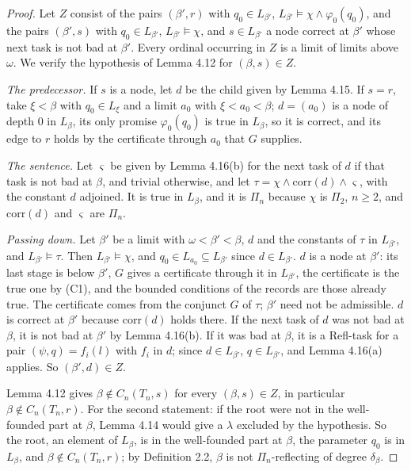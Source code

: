 \documentclass[11pt]{article}
\begin{document}
\begin{proof}
Let $Z$ consist of the pairs $(\beta', r)$ with $q_0 \in L_{\beta'}$, $L_{\beta'} \models \chi \wedge
\varphi_0(q_0)$, and the pairs $(\beta', s)$ with $q_0 \in L_{\beta'}$, $L_{\beta'} \models \chi$, and $s \in
L_{\beta'}$ a node correct at $\beta'$ whose next task is not bad at $\beta'$. Every ordinal occurring in $Z$ is a
limit of limits above $\omega$. We verify the hypothesis of Lemma 4.12 for $(\beta, s) \in Z$.

\emph{The predecessor.} If $s$ is a node, let $d$ be the child given by Lemma 4.15. If $s = r$, take $\xi < \beta$ with
$q_0 \in L_\xi$ and a limit $a_0$ with $\xi < a_0 < \beta$; $d = (a_0)$ is a node of depth 0 in $L_\beta$, its only
promise $\varphi_0(q_0)$ is true in $L_\beta$, so it is correct, and its edge to $r$ holds by the certificate through
$a_0$ that $G$ supplies.

\emph{The sentence.} Let $\varsigma$ be given by Lemma 4.16(b) for the next task of $d$ if that task is not bad at
$\beta$, and trivial otherwise, and let $\tau = \chi \wedge \mathrm{corr}(d) \wedge \varsigma$, with the constant $d$
adjoined. It is true in $L_\beta$, and it is $\Pi_n$ because $\chi$ is $\Pi_2$, $n \ge 2$, and $\mathrm{corr}(d)$ and
$\varsigma$ are $\Pi_n$.

\emph{Passing down.} Let $\beta'$ be a limit with $\omega < \beta' < \beta$, $d$ and the constants of $\tau$ in
$L_{\beta'}$, and $L_{\beta'} \models \tau$. Then $L_{\beta'} \models \chi$, and $q_0 \in L_{a_0} \subseteq
L_{\beta'}$ since $d \in L_{\beta'}$. $d$ is a node at $\beta'$: its last stage is below $\beta'$, $G$ gives a
certificate through it in $L_{\beta'}$, the certificate is the true one by (C1), and the bounded conditions of the
records are those already true. The certificate comes from the conjunct $G$ of $\tau$; $\beta'$ need not be
admissible. $d$ is correct at $\beta'$ because $\mathrm{corr}(d)$ holds there. If the next task of $d$ was not bad at
$\beta$, it is not bad at $\beta'$ by Lemma 4.16(b). If it was bad at $\beta$, it is a Refl-task for a pair $(\psi, q)
= f_i(l)$ with $f_i$ in $d$; since $d \in L_{\beta'}$, $q \in L_{\beta'}$, and Lemma 4.16(a) applies. So $(\beta', d)
\in Z$.

Lemma 4.12 gives $\beta \notin C_n(T_n, s)$ for every $(\beta, s) \in Z$, in particular $\beta \notin C_n(T_n, r)$.
For the second statement: if the root were not in the well-founded part at $\beta$, Lemma 4.14 would give a $\lambda$
excluded by the hypothesis. So the root, an element of $L_\beta$, is in the well-founded part at $\beta$, the parameter
$q_0$ is in $L_\beta$, and $\beta \notin C_n(T_n, r)$; by Definition 2.2, $\beta$ is not $\Pi_n$-reflecting of degree
$\delta_\beta$.
\end{proof}
\end{document}
